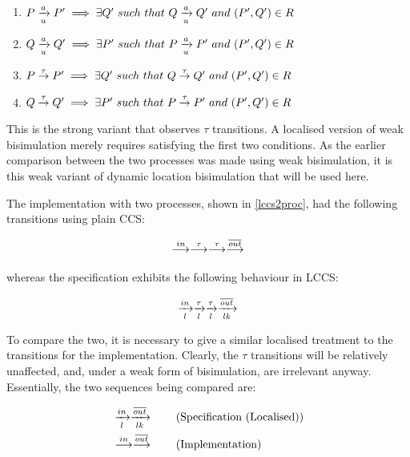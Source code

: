 \begin{enumerate}
\item $P \xrightarrow[u]{a} P^\prime \implies \exists Q^\prime\ such\
  that\ Q \xrightarrow[u]{a} Q^\prime\ and\ (P^\prime,Q^\prime) \in R$
\item $Q \xrightarrow[u]{a} Q^\prime \implies \exists P^\prime\ such\
  that\ P \xrightarrow[u]{a} P^\prime\ and\ (P^\prime,Q^\prime) \in R$
\item $P \stackrel{\tau}{\rightarrow} P^\prime \implies \exists Q^\prime\ such\
  that\ Q \stackrel{\tau}{\rightarrow} Q^\prime\ and\ (P^\prime,Q^\prime) \in R$
\item $Q \stackrel{\tau}{\rightarrow} Q^\prime \implies \exists P^\prime\ such\
  that\ P \stackrel{\tau}{\rightarrow} P^\prime\ and\ (P^\prime,Q^\prime) \in R$
\end{enumerate}

\noindent This is the strong variant that observes $\tau$ transitions.
A localised version of weak bisimulation merely requires satisfying the
first two conditions.  As the earlier comparison between the two
processes was made using weak bisimulation, it is this weak variant of
dynamic location bisimulation that will be used here.

The implementation with two processes, shown in \ref{lccs2proc}, had the
following transitions using plain CCS:

\begin{equation}
  \stackrel{in}{\longrightarrow} \stackrel{\tau}{\longrightarrow} \stackrel{\tau}{\longrightarrow} \stackrel{\overline{out}}{\longrightarrow}
\end{equation}

\noindent whereas the specification exhibits the following behaviour in
LCCS:

\begin{equation}
  \xrightarrow[l]{in} \xrightarrow[l]{\tau} \xrightarrow[l]{\tau} \xrightarrow[lk]{\overline{out}}
\end{equation}

\noindent To compare the two, it is necessary to give a similar
localised treatment to the transitions for the implementation.  Clearly,
the $\tau$ transitions will be relatively unaffected, and, under a weak
form of bisimulation, are irrelevant anyway.  Essentially, the two
sequences being compared are:

\begin{align}
& \xrightarrow[l]{in} \xrightarrow[lk]{\overline{out}} \tag{Specification
(Localised)} \\
& \stackrel{in}{\longrightarrow} \stackrel{\overline{out}}{\longrightarrow} \tag{Implementation}
\end{align}

